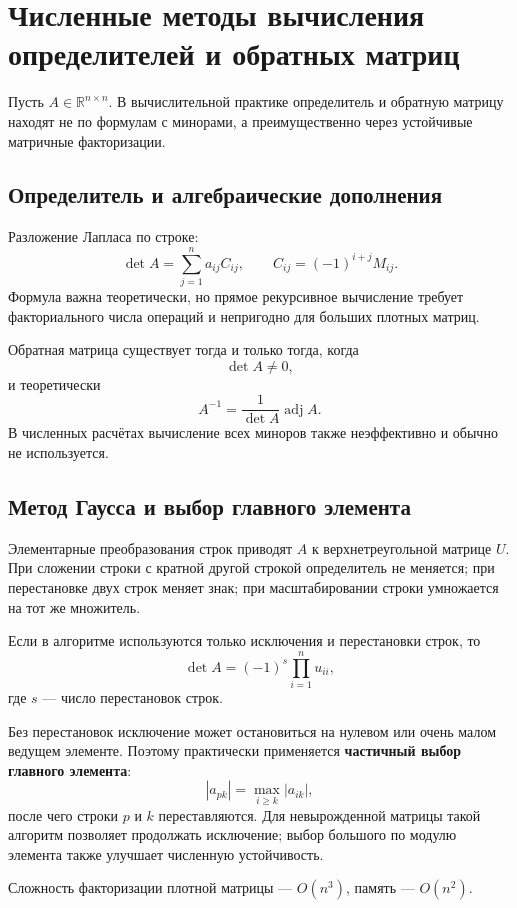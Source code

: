 \section{Численные методы вычисления определителей и обратных матриц}
\label{sec:determinants-and-inverse-matrices}

Пусть $A\in\mathbb R^{n\times n}$. В вычислительной практике определитель и обратную матрицу находят не по формулам с минорами, а преимущественно через устойчивые матричные факторизации.

\subsection{Определитель и алгебраические дополнения}

Разложение Лапласа по строке:
\[
\det A=\sum_{j=1}^{n}a_{ij}C_{ij},
\qquad
C_{ij}=(-1)^{i+j}M_{ij}.
\]
Формула важна теоретически, но прямое рекурсивное вычисление требует факториального числа операций и непригодно для больших плотных матриц.

Обратная матрица существует тогда и только тогда, когда
\[
\det A\ne0,
\]
и теоретически
\[
A^{-1}=\frac{1}{\det A}\operatorname{adj}A.
\]
В численных расчётах вычисление всех миноров также неэффективно и обычно не используется.

\subsection{Метод Гаусса и выбор главного элемента}

Элементарные преобразования строк приводят $A$ к верхнетреугольной матрице $U$. При сложении строки с кратной другой строкой определитель не меняется; при перестановке двух строк меняет знак; при масштабировании строки умножается на тот же множитель.

Если в алгоритме используются только исключения и перестановки строк, то
\[
\det A=(-1)^s\prod_{i=1}^{n}u_{ii},
\]
где $s$ --- число перестановок строк.

Без перестановок исключение может остановиться на нулевом или очень малом ведущем элементе. Поэтому практически применяется \textbf{частичный выбор главного элемента}:
\[
|a_{pk}|=\max_{i\ge k}|a_{ik}|,
\]
после чего строки $p$ и $k$ переставляются. Для невырожденной матрицы такой алгоритм позволяет продолжать исключение; выбор большого по модулю элемента также улучшает численную устойчивость.

Сложность факторизации плотной матрицы --- $O(n^3)$, память --- $O(n^2)$.

